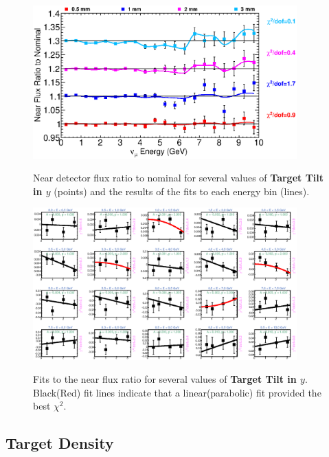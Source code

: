 \clearpage

\begin{figure}[ht]
  \begin{center}
    {\includegraphics[width=4.0in]{figures/TargetYTilt_near_summary.eps}}
  \end{center}
\caption{ Near detector flux ratio to nominal for several values of {\bf Target Tilt in $y$} (points) and the results of the fits to each energy bin (lines).}
\end{figure}

\begin{figure}[hb]
  \begin{center}
    {\includegraphics[width=4.0in]{figures/TargetYTilt_near_fits.eps}}
  \end{center}
\caption{ Fits to the near flux ratio for several values of {\bf Target Tilt in $y$}. Black(Red) fit lines indicate that a linear(parabolic) fit provided the best $\chi^2$. }
\end{figure}

\clearpage
\subsection{Target Density}

